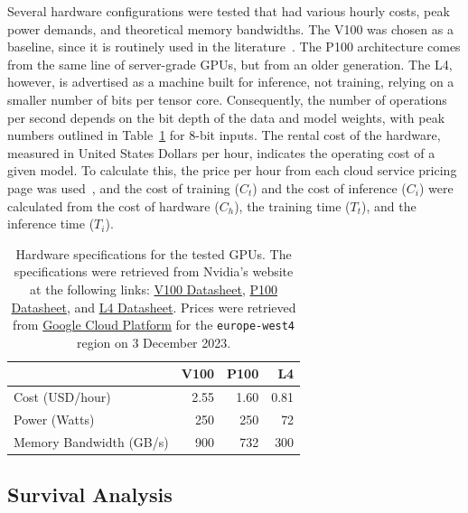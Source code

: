 \documentclass[conference]{IEEEtran}%
\begin{document}
Several hardware configurations were tested that had various hourly costs, peak power demands, and theoretical memory bandwidths. The V100 was chosen as a baseline, since it is routinely used in the literature~\cite{svedin2021benchmarking,xu2018deep}. The P100 architecture comes from the same line of server-grade GPUs, but from an older generation. 
The L4, however, is advertised as a machine built for inference, not training, relying on a smaller number of bits per tensor core. Consequently, the number of operations per second depends on the bit depth of the data and model weights, with peak numbers outlined in Table~\ref{tab:hardware} for 8-bit inputs. 
The rental cost of the hardware, measured in United States Dollars per hour, indicates the operating cost of a given model. 
To calculate this, the price per hour from each cloud service pricing page was used~\cite{pricing_1,pricing_2}, and the cost of training ($C_{t}$) and the cost of inference ($C_{i}$) were calculated from the cost of hardware ($C_{h}$), the training time ($T_{t}$), and the inference time ($T_{i}$).
\begin{table}[h]
    \centering
    \begin{tabular}{lrrr}
    \toprule
                            & V100   & P100   & L4    \\
    \midrule
    Cost (USD/hour)         & 2.55   & 1.60   & 0.81  \\
    Power (Watts)           & 250    & 250    & 72    \\
    Memory Bandwidth (GB/s) & 900    & 732    & 300   \\
    \end{tabular}
    \caption{Hardware specifications for the tested GPUs. The specifications were retrieved from Nvidia's website at the following links:
    \href{https://images.nvidia.com/content/technologies/volta/pdf/volta-v100-datasheet-update-us-1165301-r5.pdf}{V100 Datasheet},
    \href{https://images.nvidia.com/content/tesla/pdf/nvidia-tesla-p100-PCIe-datasheet.pdf}{P100 Datasheet}, and
    \href{https://nvdam.widen.net/s/rvq98gbwsw/l4-datasheet-2595652}{L4 Datasheet}. Prices were retrieved from \href{https://cloud.google.com/pricing/list}{Google Cloud Platform} for the \texttt{europe-west4} region on 3 December 2023.
    }
    \label{tab:hardware}
\end{table}


\subsection{Survival Analysis}
\end{document}
